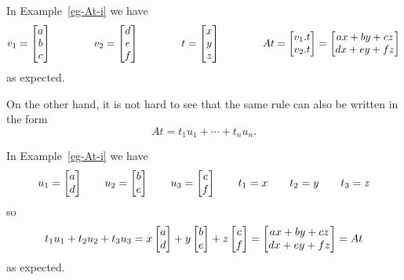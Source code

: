 \documentclass[reqno]{amsart}
\theoremstyle{definition}
\begin{document}
In Example~\ref{eg-At-i} we have 
\[ v_1 = \left[\begin{matrix} a \\ b \\ c \end{matrix}\right] \hspace{4em}
   v_2 = \left[\begin{matrix} d \\ e \\ f \end{matrix}\right] \hspace{4em}
   t   = \left[\begin{matrix} x \\ y \\ z \end{matrix}\right] \hspace{4em}
   At = \left[\begin{matrix} v_1.t \\ v_2.t \end{matrix}\right] 
      = \left[\begin{matrix} ax+by+cz \\ dx+ey+fz \end{matrix}\right]
\]
as expected.  

On the other hand, it is not hard to see that the same rule can also
be written in the form 
\[ At = t_1u_1 + \dotsb + t_nu_n. \]

In Example~\ref{eg-At-i} we have 
\[ u_1 = \left[\begin{matrix} a \\ d \end{matrix}\right] \qquad
   u_2 = \left[\begin{matrix} b \\ e \end{matrix}\right] \qquad
   u_3 = \left[\begin{matrix} c \\ f \end{matrix}\right] \qquad
   t_1 = x \qquad
   t_2 = y \qquad
   t_3 = z
\]
so 
\[ t_1u_1+t_2u_2+t_3u_3 = 
    x \left[\begin{matrix} a \\ d \end{matrix}\right] + 
    y \left[\begin{matrix} b \\ e \end{matrix}\right] + 
    z \left[\begin{matrix} c \\ f \end{matrix}\right] =
    \left[\begin{matrix} ax+by+cz \\ dx+ey+fz \end{matrix}\right] = At
\]
as expected.
\end{document}
